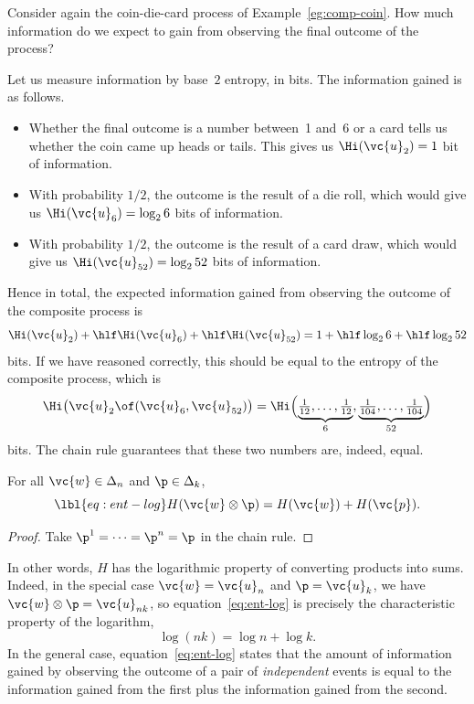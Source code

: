 \begin{example}
% 
Consider again the coin-die-card process of Example~\ref{eg:comp-coin}.
How much information do we expect to gain from observing the final outcome
of the process?

Let us measure information by base~$2$ entropy, in bits.  The information
gained is as follows.
% 
\begin{itemize}
\item
Whether the final outcome is a number between~1 and~6 or a card tells us
whether the coin came up heads or tails.  This gives us $\Hi(\vc{u}_2) = 1$
bit of information.

\item
With probability $1/2$, the outcome is the result of a die roll,
which would give us $\Hi(\vc{u}_6) = \log_2 6$ bits of information.

\item
With probability $1/2$, the outcome is the result of a card%
%
% 
draw, which would give us $\Hi(\vc{u}_{52}) = \log_2 52$ bits of
information. 
\end{itemize}
% 
Hence in total, the expected information gained from observing the outcome
of the composite process is
\[
\Hi(\vc{u}_2) + \hlf \Hi(\vc{u}_6) + \hlf \Hi(\vc{u}_{52})
=
1 + \hlf \log_2 6 + \hlf \log_2 52
\]
bits.  If we have reasoned correctly, this should be equal to the entropy
of the composite process, which is
\[
\Hi\bigl(\vc{u}_2 \of (\vc{u}_6, \vc{u}_{52})\bigr)
=
\Hi\Bigl(\underbrace{\tfrac{1}{12}, \ldots, \tfrac{1}{12}}_{6},
\underbrace{\tfrac{1}{104}, \ldots, \tfrac{1}{104}}_{52}\Bigr)
\]
bits.  The chain rule guarantees that these two numbers are, indeed, equal.
\end{example}

\begin{cor}
For all $\vc{w} \in \Delta_n$ and $\p \in \Delta_k$,
% 
\begin{equation}
\lbl{eq:ent-log}
H(\vc{w} \otimes \p) = H(\vc{w}) + H(\vc{p}).
\end{equation}
\end{cor}

\begin{proof}
Take $\p^1 = \cdots = \p^n = \p$ in the chain rule.  
\end{proof}

In other words, $H$ has the logarithmic property of converting products
into sums.  Indeed, in the special case $\vc{w} = \vc{u}_n$ and $\p =
\vc{u}_k$, we have $\vc{w} \otimes \p = \vc{u}_{nk}$, so
equation~\eqref{eq:ent-log} is precisely the characteristic property of
the logarithm,
\[
\log(nk) = \log n + \log k.
\]
In the general case, equation~\eqref{eq:ent-log} states that the amount of
information gained by observing the outcome of a pair of
\emph{independent} events is equal to the information gained from the first
plus the information gained from the second.


